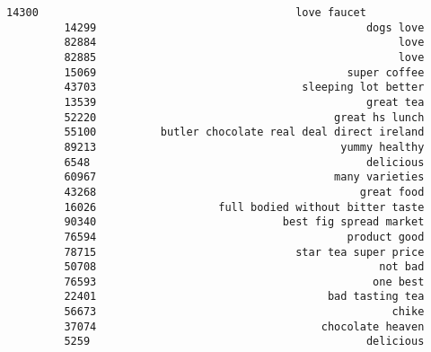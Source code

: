 \documentclass[11pt]{article}
\begin{document}
\begin{Verbatim}[commandchars=\\\{\}]
         14300                                        love faucet   
         14299                                          dogs love   
         82884                                               love   
         82885                                               love   
         15069                                       super coffee   
         43703                                sleeping lot better   
         13539                                          great tea   
         52220                                     great hs lunch   
         55100          butler chocolate real deal direct ireland   
         89213                                      yummy healthy   
         6548                                           delicious   
         60967                                     many varieties   
         43268                                         great food   
         16026                   full bodied without bitter taste   
         90340                             best fig spread market   
         76594                                       product good   
         78715                               star tea super price   
         50708                                            not bad   
         76593                                           one best   
         22401                                    bad tasting tea   
         56673                                              chike   
         37074                                   chocolate heaven   
         5259                                           delicious   
         

\end{Verbatim}
\end{document}
